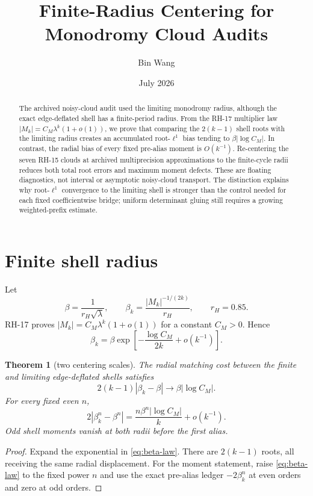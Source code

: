 \documentclass[11pt]{article}
\title{Finite-Radius Centering for Monodromy Cloud Audits}
\author{Bin Wang}\date{July 2026}
\newtheorem{theorem}{Theorem}[section]
\theoremstyle{remark}\newtheorem{remark}[theorem]{Remark}
\begin{document}
\maketitle
\begin{abstract}
The archived noisy-cloud audit used the limiting monodromy radius, although
the exact edge-deflated shell has a finite-period radius.  From the RH-17
multiplier law $|M_k|=C_M\lambda^k(1+o(1))$, we prove that comparing the
$2(k-1)$ shell roots with the limiting radius creates an accumulated
root-$\ell^1$ bias tending to $\beta|\log C_M|$.  In contrast, the radial
bias of every fixed pre-alias moment is $O(k^{-1})$.  Re-centering the seven
RH-15 clouds at archived multiprecision approximations to the finite-cycle
radii reduces both total root errors and maximum moment defects.  These are
floating diagnostics, not interval or asymptotic noisy-cloud transport.  The
distinction explains why root-$\ell^1$ convergence to the limiting shell is
stronger than the control needed for each fixed coefficientwise bridge;
uniform determinant gluing still requires a growing weighted-prefix estimate.
\end{abstract}

\section{Finite shell radius}
Let
\[
 \beta=\frac1{r_H\sqrt\lambda},\qquad
 \beta_k=\frac{|M_k|^{-1/(2k)}}{r_H},\qquad r_H=0.85.
\]
RH-17 proves $|M_k|=C_M\lambda^k(1+o(1))$ for a constant $C_M>0$.
Hence
\begin{equation}\label{eq:beta-law}
 \beta_k=\beta\exp\left[-\frac{\log C_M}{2k}+o(k^{-1})\right].
\end{equation}

\begin{theorem}[two centering scales]\label{thm:centering}
The radial matching cost between the finite and limiting edge-deflated
shells satisfies
\[
 2(k-1)|\beta_k-\beta|\longrightarrow
 \beta|\log C_M|.
\]
For every fixed even $n$,
\[
 2|\beta_k^n-\beta^n|
 =\frac{n\beta^n|\log C_M|}{k}+o(k^{-1}).
\]
Odd shell moments vanish at both radii before the first alias.
\end{theorem}
\begin{proof}
Expand the exponential in \eqref{eq:beta-law}.  There are $2(k-1)$ roots,
all receiving the same radial displacement.  For the moment statement,
raise \eqref{eq:beta-law} to the fixed power $n$ and use the exact pre-alias
ledger $-2\beta_k^n$ at even orders and zero at odd orders.
\end{proof}
\end{document}
